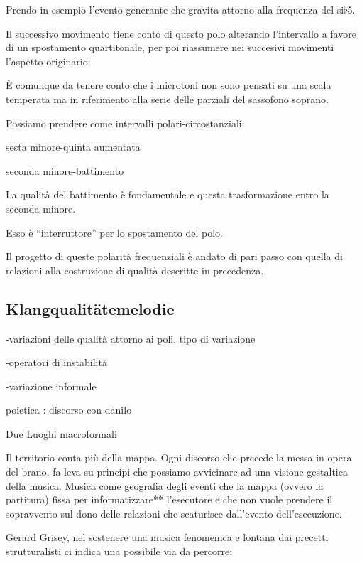 Prendo in esempio l’evento generante che gravita attorno alla frequenza del si{\large$\flat$}5.

Il successivo movimento tiene conto di questo polo alterando l’intervallo a favore
di un spostamento quartitonale, per poi riassumere nei succesivi movimenti l’aspetto originario:

È comunque da tenere conto che i microtoni non sono pensati su una scala temperata ma
in riferimento alla serie delle parziali del sassofono soprano.

Possiamo prendere come intervalli polari-circostanziali:

\begin{center}
sesta minore-quinta aumentata
\end{center}

\begin{center}
seconda minore-battimento
\end{center}

La qualità del battimento è fondamentale e questa trasformazione entro la seconda minore.

Esso è “interruttore” per lo spostamento del polo.

Il progetto di queste polarità frequenziali è andato di pari passo con quella di
relazioni alla costruzione di qualità descritte in precedenza.

\subsection{Klangqualitätemelodie}

-variazioni delle qualità attorno ai poli. tipo di variazione

-operatori di instabilità

-variazione informale

 poietica : discorso con danilo

Due Luoghi macroformali

Il territorio conta più della mappa.
Ogni discorso che precede la messa in opera del brano, fa leva su principi che possiamo avvicinare ad una visione gestaltica della musica.
Musica come geografia degli eventi che la mappa (ovvero la partitura) fissa per informatizzare** l'esecutore e  che non vuole prendere il sopravvento sul dono delle relazioni che scaturisce dall'evento dell'esecuzione.

Gerard Grisey, nel sostenere una musica fenomenica e lontana dai precetti strutturalisti ci indica una possibile via da percorre:

